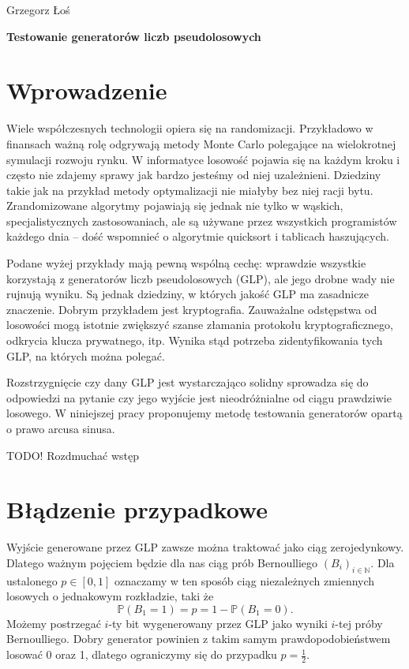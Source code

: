 \documentclass[a4paper,11pt,oneside]{book}
\newcommand{\Prob}{\mathbb{P}}
\begin{document}
\begin{center}
\begin{Large}Grzegorz Łoś\end{Large}

\begin{huge}\textbf{Testowanie generatorów liczb pseudolosowych} \end{huge}
\end{center}


\begin{minipage}{0.8\linewidth}
\tableofcontents
\end{minipage}

\chapter*{Wprowadzenie}
Wiele współczesnych technologii opiera się na randomizacji. Przykładowo w finansach ważną rolę odgrywają metody Monte Carlo polegające na wielokrotnej symulacji rozwoju rynku. W informatyce losowość pojawia się na każdym kroku i często nie zdajemy sprawy jak bardzo jesteśmy od niej uzależnieni. Dziedziny takie jak na przykład metody optymalizacji nie miałyby bez niej racji bytu. Zrandomizowane algorytmy pojawiają się jednak nie tylko w wąskich, specjalistycznych zastosowaniach, ale są używane przez wszystkich programistów każdego dnia -- dość wspomnieć o algorytmie quicksort i tablicach haszujących.

Podane wyżej przykłady mają pewną wspólną cechę: wprawdzie wszystkie korzystają z generatorów liczb pseudolosowych (GLP), ale jego drobne wady nie rujnują wyniku. Są jednak dziedziny, w których jakość GLP ma zasadnicze znaczenie. Dobrym przykładem jest kryptografia. Zauważalne odstępstwa od losowości mogą istotnie zwiększyć szanse złamania protokołu kryptograficznego, odkrycia klucza prywatnego, itp. Wynika stąd potrzeba zidentyfikowania tych GLP, na których można polegać.

Rozstrzygnięcie czy dany GLP jest wystarczająco solidny sprowadza się do odpowiedzi na pytanie czy jego wyjście jest nieodróżnialne od ciągu prawdziwie losowego. W niniejszej pracy proponujemy metodę testowania generatorów opartą o prawo arcusa sinusa.

{\bigskip \color{red} \LARGE{TODO!} Rozdmuchać wstęp}


\chapter{Błądzenie przypadkowe}
Wyjście generowane przez GLP zawsze można traktować jako ciąg zerojedynkowy. Dlatego ważnym pojęciem będzie dla nas ciąg prób Bernoulliego $(B_i)_{i \in \mathbb{N}}$. Dla ustalonego $p \in [0,1]$ oznaczamy w ten sposób ciąg niezależnych zmiennych losowych o jednakowym rozkładzie, taki że
\[ \Prob(B_1 = 1) = p = 1 - \Prob(B_1 = 0). \]
Możemy postrzegać $i$-ty bit wygenerowany przez GLP jako wyniki $i$-tej próby Bernoulliego. Dobry generator powinien z takim samym prawdopodobieństwem losować 0 oraz 1, dlatego ograniczymy się do przypadku $p = \frac{1}{2}$.
\end{document}
